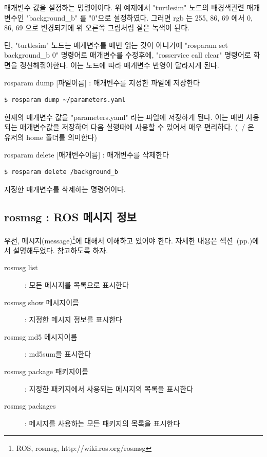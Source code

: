 \noindent
매개변수 값을 설정하는 명령어이다. 위 예제에서 "turtlesim" 노드의 배경색관련 매개변수인 "background\_b" 를 "0"으로 설정하였다. 그러면 rgb 는 255, 86, 69 에서 0, 86, 69 으로 변경되기에 위 오른쪽 그림처럼 짙은 녹색이 된다.

단, "turtlesim" 노드는 매개변수를 매번 읽는 것이 아니기에 "rosparam set background\_b 0" 명령어로 매개변수를 수정후에, "rosservice call clear" 명령어로 화면을 갱신해줘야한다. 이는 노드에 따라 매개변수 반영이 달라지게 된다.

\vspace{\baselineskip}
\noindent
{}\circled{\thenum} rosparam dump [파일이름] : 매개변수를 지정한 파일에 저장한다

\begin{lstlisting}[language=ROS]
$ rosparam dump ~/parameters.yaml
\end{lstlisting}

\noindent
현재의 매개변수 값을 "parameters.yaml" 라는 파일에 저장하게 된다. 이는 매번 사용되는 매개변수값을 저장하여 다음 실행때에 사용할 수 있어서 매우 편리하다. (~/ 은 유저의 home 폴더를 의미한다)

\vspace{\baselineskip}
\noindent
{}\circled{\thenum} rosparam delete [매개변수이름] : 매개변수를 삭제한다

\begin{lstlisting}[language=ROS]
$ rosparam delete /background_b
\end{lstlisting}

\noindent
지정한 매개변수를 삭제하는 명령어이다.

\subsection{rosmsg : ROS 메시지 정보}

우선, 메시지(message)\footnote{ROS, rosmsg, http://wiki.ros.org/rosmsg}에 대해서 이해하고 있어야 한다. 자세한 내용은 섹션~(pp.\pageref{def:RosMessage})에서 설명해두었다. 참고하도록 하자.

\vspace{\baselineskip}
\noindent
\begin{description}
\item[rosmsg list] : 모든 메시지를 목록으로 표시한다
\item[rosmsg show 메시지이름] : 지정한 메시지 정보를 표시한다
\item[rosmsg md5 메시지이름] : md5sum을 표시한다
\item[rosmsg package 패키지이름] : 지정한 패키지에서 사용되는 메시지의 목록을 표시한다
\item[rosmsg packages] : 메시지를 사용하는 모든 패키지의 목록을 표시한다
\end{description}

